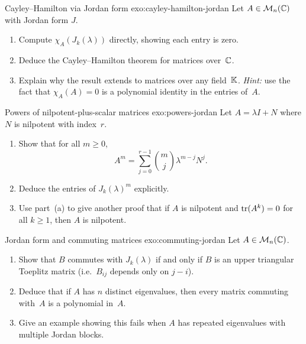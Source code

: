 \begin{exercise}{Cayley--Hamilton via Jordan form \challenging}%
{exo:cayley-hamilton-jordan}
Let $A \in \mathcal{M}_n({\mathbb{C}})$ with Jordan form $J$.
\begin{enumerate}[label=(\alph*)]
  \item Compute $\chi_A(J_{k}(\lambda))$ directly, showing each
    entry is zero.
  \item Deduce the Cayley--Hamilton theorem for matrices over~${\mathbb{C}}$.
  \item Explain why the result extends to matrices over any field~${\mathbb{K}}$.
    \emph{Hint:} use the fact that $\chi_A(A) = 0$ is a polynomial
    identity in the entries of~$A$.
\end{enumerate}
\end{exercise}

\begin{exercise}{Powers of nilpotent-plus-scalar matrices
\challenging}{exo:powers-jordan}
Let $A = \lambda I + N$ where $N$ is nilpotent with index~$r$.
\begin{enumerate}[label=(\alph*)]
  \item Show that for all $m \geq 0$,
    \[
      A^m = \sum_{j=0}^{r-1} \binom{m}{j} \lambda^{m-j} N^j.
    \]
  \item Deduce the entries of $J_k(\lambda)^m$ explicitly.
  \item Use part~(a) to give another proof that if $A$ is nilpotent
    and $\operatorname{tr}(A^k) = 0$ for all $k \geq 1$, then $A$ is nilpotent.
\end{enumerate}
\end{exercise}

\begin{exercise}{Jordan form and commuting matrices \challenging}%
{exo:commuting-jordan}
Let $A \in \mathcal{M}_n({\mathbb{C}})$.
\begin{enumerate}[label=(\alph*)]
  \item Show that $B$ commutes with $J_k(\lambda)$ if and only if $B$
    is an upper triangular Toeplitz matrix (i.e.\ $B_{ij}$ depends only
    on $j - i$).
  \item Deduce that if $A$ has $n$ distinct eigenvalues, then every
    matrix commuting with~$A$ is a polynomial in~$A$.
  \item Give an example showing this fails when $A$ has repeated
    eigenvalues with multiple Jordan blocks.
\end{enumerate}
\end{exercise}

